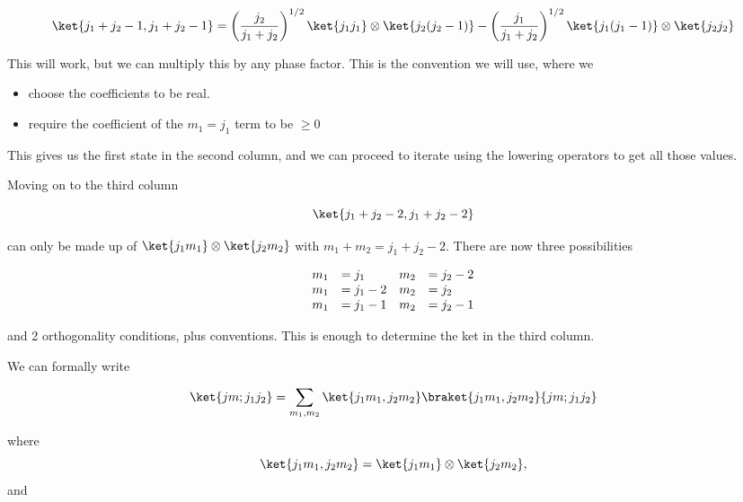\begin{equation}\label{eqn:qmTwoL18:110}
\ket{j_1 + j_2 - 1, j_1 + j_2 -1} 
=
\left(\frac{j_2}{j_1 + j_2}\right)^{1/2}
\ket{j_1 j_1} \otimes \ket{j_2 (j_2-1)}
-
\left(\frac{j_1}{j_1 + j_2}\right)^{1/2}
\ket{j_1 (j_1-1)} \otimes \ket{j_2 j_2}
\end{equation}

This will work, but we can multiply this by any phase factor.  This is the convention we will use, where we

\begin{itemize}
\item choose the coefficients to be real.
\item require the coefficient of the $m_1 = j_1$ term to be $\ge 0$
\end{itemize}

This gives us the first state in the second column, and we can proceed to iterate using the lowering operators to get all those values.

Moving on to the third column

\begin{equation}\label{eqn:qmTwoL18:130}
\ket{j_1 + j_2 - 2, j_1 + j_2 -2} 
\end{equation}

can only be made up of $\ket{j_1 m_1} \otimes \ket{j_2 m_2}$ with $m_1 + m_2 = j_1 + j_2 -2$.  There are now three possibilities

\begin{equation}\label{eqn:qmTwoL18:150}
\begin{array}{l l l l}
m_1 &= j_1	 &  m_2 &= j_2 - 2 \\
m_1 &= j_1 - 2  &  m_2 &= j_2 \\
m_1 &= j_1 - 1  &  m_2 &= j_2 - 1
\end{array}
\end{equation}

and 2 orthogonality conditions, plus conventions.  This is enough to determine the ket in the third column.

We can formally write

\begin{equation}\label{eqn:qmTwoL18:170}
\ket{jm ; j_1 j_2} = 
\sum_{m_1, m_2}
\ket{ j_1 m_1, j_2 m_2}
\braket{ j_1 m_1, j_2 m_2}{jm ; j_1 j_2} 
\end{equation}

where
\begin{equation}\label{eqn:qmTwoL18:190}
\ket{ j_1 m_1, j_2 m_2} = \ket{j_1 m_1} \otimes \ket{j_2 m_2},
\end{equation}
and

